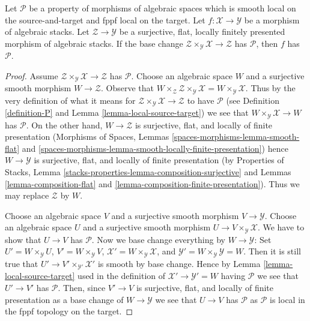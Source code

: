 \begin{lemma}
\label{lemma-descent-property}
Let $\mathcal{P}$ be a property of morphisms of algebraic spaces
which is smooth local on the source-and-target and fppf local
on the target.
Let $f : \mathcal{X} \to \mathcal{Y}$ be a morphism of algebraic stacks.
Let $\mathcal{Z} \to \mathcal{Y}$ be a surjective, flat, locally finitely
presented morphism of algebraic stacks. If the base change
$\mathcal{Z} \times_\mathcal{Y} \mathcal{X} \to \mathcal{Z}$
has $\mathcal{P}$, then $f$ has $\mathcal{P}$.
\end{lemma}

\begin{proof}
Assume $\mathcal{Z} \times_\mathcal{Y} \mathcal{X} \to \mathcal{Z}$
has $\mathcal{P}$. Choose an algebraic space $W$ and a surjective
smooth morphism $W \to \mathcal{Z}$. Observe that
$W \times_\mathcal{Z} \mathcal{Z} \times_\mathcal{Y} \mathcal{X} =
W \times_\mathcal{Y} \mathcal{X}$. Thus by the very definition of
what it means for $\mathcal{Z} \times_\mathcal{Y} \mathcal{X} \to \mathcal{Z}$
to have $\mathcal{P}$ (see Definition \ref{definition-P}
and Lemma \ref{lemma-local-source-target})
we see that $W \times_\mathcal{Y} \mathcal{X} \to W$
has $\mathcal{P}$. On the other hand, $W \to \mathcal{Z}$
is surjective, flat, and locally of finite presentation
(Morphisms of Spaces, Lemmas
\ref{spaces-morphisms-lemma-smooth-flat} and
\ref{spaces-morphisms-lemma-smooth-locally-finite-presentation})
hence $W \to \mathcal{Y}$ is surjective, flat, and locally of finite
presentation (by
Properties of Stacks, Lemma
\ref{stacks-properties-lemma-composition-surjective}
and
Lemmas \ref{lemma-composition-flat} and
\ref{lemma-composition-finite-presentation}).
Thus we may replace $\mathcal{Z}$ by $W$.

\medskip\noindent
Choose an algebraic space $V$ and a surjective smooth morphism
$V \to \mathcal{Y}$. Choose an algebraic space $U$ and a surjective
smooth morphism $U \to V \times_\mathcal{Y} \mathcal{X}$.
We have to show that $U \to V$ has $\mathcal{P}$.
Now we base change everything by $W \to \mathcal{Y}$: Set
$U' = W \times_\mathcal{Y} U$,
$V' = W \times_\mathcal{Y} V$,
$\mathcal{X}' = W \times_\mathcal{Y} \mathcal{X}$,
and $\mathcal{Y}' = W \times_\mathcal{Y} \mathcal{Y} = W$.
Then it is still true that $U' \to V' \times_{\mathcal{Y}'} \mathcal{X}'$
is smooth by base change. Hence by Lemma \ref{lemma-local-source-target}
used in the definition of $\mathcal{X}' \to \mathcal{Y}' = W$
having $\mathcal{P}$ we see that $U' \to V'$ has $\mathcal{P}$.
Then, since $V' \to V$ is surjective, flat, and locally of finite presentation
as a base change of $W \to \mathcal{Y}$ we see that $U \to V$
has $\mathcal{P}$ as $\mathcal{P}$ is local in the fppf topology
on the target.
\end{proof}


